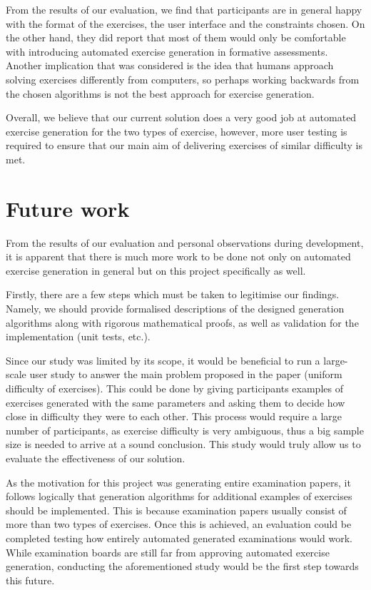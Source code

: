 \documentclass{l4proj}
\begin{document}
From the results of our evaluation, we find that participants are in general happy with the format of the exercises, the user interface and the constraints chosen. On the other hand, they did report that most of them would only be comfortable with introducing automated exercise generation in formative assessments. Another implication that was considered is the idea that humans approach solving exercises differently from computers, so perhaps working backwards from the chosen algorithms is not the best approach for exercise generation.

Overall, we believe that our current solution does a very good job at automated exercise generation for the two types of exercise, however, more user testing is required to ensure that our main aim of delivering exercises of similar difficulty is met.

\section{Future work}
\label{sec:future_work}

From the results of our evaluation and personal observations during development, it is apparent that there is much more work to be done not only on automated exercise generation in general but on this project specifically as well.

Firstly, there are a few steps which must be taken to legitimise our findings. Namely, we should provide formalised descriptions of the designed generation algorithms along with rigorous mathematical proofs, as well as validation for the implementation (unit tests, etc.). 

Since our study was limited by its scope, it would be beneficial to run a large-scale user study to answer the main problem proposed in the paper (uniform difficulty of exercises). This could be done by giving participants examples of exercises generated with the same parameters and asking them to decide how close in difficulty they were to each other. This process would require a large number of participants, as exercise difficulty is very ambiguous, thus a big sample size is needed to arrive at a sound conclusion. This study would truly allow us to evaluate the effectiveness of our solution.

As the motivation for this project was generating entire examination papers, it follows logically that generation algorithms for additional examples of exercises should be implemented. This is because examination papers usually consist of more than two types of exercises. Once this is achieved, an evaluation could be completed testing how entirely automated generated examinations would work. While examination boards are still far from approving automated exercise generation, conducting the aforementioned study would be the first step towards this future.
\end{document}
